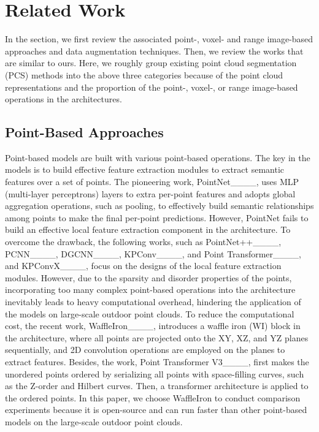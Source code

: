 \section{Related Work}
\label{sec:related_works}
In the section, we first review the associated point-, voxel- and range image-based approaches and data augmentation techniques. Then, we review the works that are similar to ours. Here, we roughly group existing point cloud segmentation (PCS) methods into the above three categories because of the point cloud representations and the proportion of the point-, voxel-, or range image-based operations in the architectures. %


\subsection{Point-Based Approaches}
Point-based models are built with various point-based operations. The key in the models is to build effective feature extraction modules to extract semantic features over a set of points. The pioneering work, PointNet____, uses MLP (multi-layer perceptrons) layers to extra per-point features and adopts global aggregation operations, such as pooling, to effectively build semantic relationships among points to make the final per-point predictions. However, PointNet fails to build an effective local feature extraction component in the architecture. To overcome the drawback, the following works, such as PointNet++____, PCNN____, DGCNN____, KPConv____, and Point Transformer____, and KPConvX____, focus on the designs of the local feature extraction modules. However, due to the sparsity and disorder properties of the points, incorporating too many complex point-based operations into the architecture inevitably leads to heavy computational overhead, hindering the application of the models on large-scale outdoor point clouds. To reduce the computational cost, the recent work, WaffleIron____, introduces a waffle iron (WI) block in the architecture, where all points are projected onto the XY, XZ, and YZ planes sequentially, and 2D convolution operations are employed on the planes to extract features. Besides, the work, Point Transformer V3____, first makes the unordered points ordered by serializing all points with space-filling curves, such as the Z-order and Hilbert curves. Then, a transformer architecture is applied to the ordered points. In this paper, we choose WaffleIron to conduct comparison experiments because it is open-source and can run faster than other point-based models on the large-scale outdoor point clouds.


